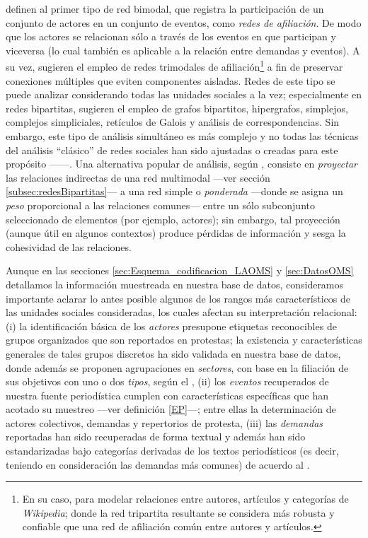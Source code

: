 \documentclass[letterpaper, 11pt]{book}
\theoremstyle{definition}
\theoremstyle{remark}
\begin{document}
\citet{1994_Wasserman_SNA} definen al primer tipo de red bimodal, que registra la participación de un conjunto de actores en un conjunto de eventos, como \emph{redes de afiliación}. 
De modo que los actores se relacionan sólo a través de los eventos en que participan y viceversa (lo cual también es aplicable a la relación entre demandas y eventos). 
A su vez, \citet{2008_Nazir_TripartiteRelationships} sugieren el empleo de redes trimodales de afiliación\footnote{
    En su caso, para modelar relaciones entre autores, artículos y categorías de \emph{Wikipedia}; donde la red tripartita resultante se considera más robusta y confiable que una red de afiliación común entre autores y artículos. 
} 
a fin de preservar conexiones múltiples que eviten componentes aisladas. 
Redes de este tipo se puede analizar considerando todas las unidades sociales a la vez; especialmente en redes bipartitas, \citet{1994_Wasserman_SNA} sugieren el empleo de grafos bipartitos, hipergrafos, simplejos, complejos simpliciales, retículos de Galois y análisis de correspondencias. 
Sin embargo, este tipo de análisis simultáneo es más complejo y no todas las técnicas del análisis ``clásico'' de redes sociales han sido ajustadas o creadas para este propósito ---\citet{1997_Borgatti_2ModeSNA}---. 
Una alternativa popular de análisis, según \citet{2013_Opsahl_BipartiteCluster}, consiste en \emph{proyectar} las relaciones indirectas de una red multimodal ---ver sección \ref{subsec:redesBipartitas}--- a una red simple o \emph{ponderada} ---donde se asigna un \emph{peso} proporcional a las relaciones comunes--- entre un sólo subconjunto seleccionado de elementos (por ejemplo, actores); sin embargo, tal proyección (aunque útil en algunos contextos) produce pérdidas de información y sesga la cohesividad de las relaciones.


Aunque en las secciones \ref{sec:Esquema_codificacion_LAOMS} y \ref{sec:DatosOMS} detallamos la información muestreada en nuestra base de datos, consideramos importante aclarar lo antes posible algunos de los rangos más característicos de las unidades sociales consideradas, los cuales afectan su interpretación relacional: 
(i) la identificación básica de los \emph{actores} presupone etiquetas reconocibles de grupos organizados que son reportados en protestas; la existencia y características generales de tales grupos discretos ha sido validada en nuestra base de datos, donde además se proponen agrupaciones en \emph{sectores}, con base en la filiación de sus objetivos con uno o dos \emph{tipos}, según el , 
(ii) los \emph{eventos} recuperados de nuestra fuente periodística cumplen con características específicas que han acotado su muestreo ---ver definición \ref{EP}---; entre ellas la determinación de actores colectivos, demandas y repertorios de protesta,  
(iii) las \emph{demandas} reportadas han sido recuperadas de forma textual y además han sido estandarizadas bajo categorías derivadas de los textos periodísticos (es decir, teniendo en consideración las demandas más comunes) de acuerdo al . 
\end{document}
